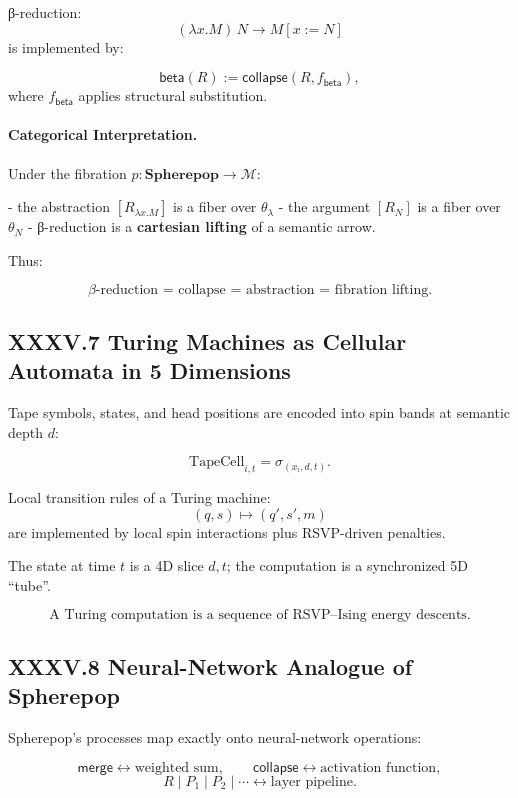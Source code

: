 \documentclass[11pt,letterpaper]{article}
\begin{document}
β-reduction:
\[
(\lambda x.M)\,N \to M[x:=N]
\]
is implemented by:

\[
\mathsf{beta}(R) 
:= 
\mathsf{collapse}(R, f_{\mathsf{beta}}),
\]
where $f_{\mathsf{beta}}$ applies structural substitution.

\paragraph{Categorical Interpretation.}  
Under the fibration $p : \mathbf{Spherepop} \to \mathcal{M}$:

- the abstraction $[R_{\lambda x.M}]$ is a fiber over $\theta_{\lambda}$  
- the argument $[R_N]$ is a fiber over $\theta_N$  
- β-reduction is a \textbf{cartesian lifting} of a semantic arrow.

Thus:

\[
\boxed{
\beta\text{-reduction = collapse = abstraction = fibration lifting}.
}
\]

\subsection{XXXV.7 Turing Machines as Cellular Automata in 5 Dimensions}

Tape symbols, states, and head positions are encoded into spin bands 
at semantic depth $d$:

\[
\text{TapeCell}_{i,t} = \sigma_{(x_i,d,t)}.
\]

Local transition rules of a Turing machine:
\[
(q, s) \mapsto (q',s',m)
\]
are implemented by local spin interactions plus RSVP-driven penalties.

The state at time $t$ is a 4D slice $d,t$;  
the computation is a synchronized 5D ``tube''.

\[
\boxed{
\text{A Turing computation is a sequence of RSVP--Ising energy descents.}
}
\]

\subsection{XXXV.8 Neural-Network Analogue of Spherepop}

Spherepop's processes map exactly onto neural-network operations:

\[
\mathsf{merge} \longleftrightarrow \text{weighted sum},\qquad
\mathsf{collapse} \longleftrightarrow \text{activation function},
\]
\[
R \mid P_1 \mid P_2 \mid \cdots \longleftrightarrow \text{layer pipeline}.
\]
\end{document}
